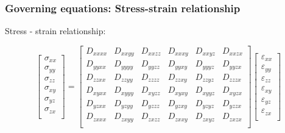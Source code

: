 \documentclass[notes]{beamer}
\begin{document}
\begin{frame}
\frametitle{Governing equations: Stress-strain relationship}
Stress - strain relationship: 

\begin{equation*}
	\begin{bmatrix}
	\sigma_{xx} \\
	\sigma_{yy} \\
	\sigma_{zz} \\
	\sigma_{xy} \\
	\sigma_{yz} \\
	\sigma_{zx} \\
	\end{bmatrix} %
	= %
	\begin{bmatrix}
	D_{xxxx} & D_{xxyy} & D_{xxzz} & D_{xxxy} &   D_{xxyz} & D_{xxzx}\\
	D_{yyxx} & D_{yyyy} & D_{yyzz} & D_{yyxy} & D_{yyyz} & D_{yyzx}\\
	D_{zzxx} & D_{zzyy} & D_{zzzz} & D_{zzxy} & D_{zzyz} & D_{zzzx}\\
	D_{xyxx} & D_{xyyy} & D_{xyzz} & D_{xyxy} &   D_{xyyz} & D_{xyzx}\\
	D_{yzxx} & D_{yzyy} & D_{yzzz} & D_{yzxy} & D_{yzyz} & D_{yzzx}\\
	D_{zxxx} & D_{zxyy} & D_{zxzz} & D_{zxxy} & D_{zxyz} & D_{zxzx}\\
	\end{bmatrix} %
	\begin{bmatrix}
	\varepsilon_{xx} \\
	\varepsilon_{yy} \\
	\varepsilon_{zz} \\
	\varepsilon_{xy} \\
	\varepsilon_{yz} \\
	\varepsilon_{zx} \\
	\end{bmatrix}
\end{equation*}
\end{frame}
\end{document}
